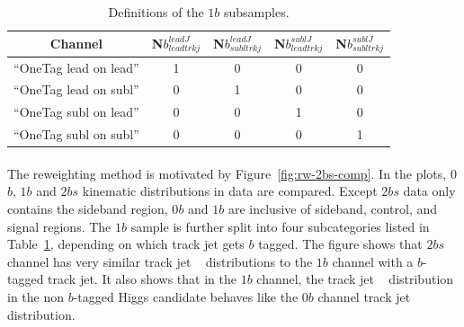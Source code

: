 \begin{table}[htb!]
\begin{center}
\caption{Definitions of the $1b$ subsamples.}
\begin{tabular}{c|c|c|c|c}
\hline
  Channel & N$b^{leadJ}_{leadtrkj}$ & N$b^{leadJ}_{subltrkj}$ & N$b^{sublJ}_{leadtrkj}$ & N$b^{sublJ}_{subltrkj}$ \\
  \hline
  ``OneTag lead on lead'' & 1 & 0 & 0 & 0 \\
  ``OneTag lead on subl'' & 0 & 1 & 0 & 0 \\
  ``OneTag subl on lead'' & 0 & 0 & 1 & 0 \\
  ``OneTag subl on subl'' & 0 & 0 & 0 & 1 \\
  \end{tabular}
\label{tab:boosted-qcd-1bsample}
\end{center}
\end{table}

\paragraph{}
The reweighting method is motivated by Figure~\ref{fig:rw-2bs-comp}.
In the plots, 0$b$, $1b$ and $2bs$ kinematic distributions in data are compared.
Except $2bs$ data only contains the sideband region, 0$b$ and $1b$ are inclusive of sideband, control, and signal regions.
The $1b$ sample is further split into four subcategories listed in Table~\ref{tab:boosted-qcd-1bsample}, depending on which track jet gets $b$ tagged.
The figure shows that $2bs$ channel has very similar track jet \pt~ distributions to the $1b$ channel with a $b$-tagged track jet.
It also shows that in the $1b$ channel, the track jet \pt~ distribution in the non $b$-tagged Higgs candidate behaves like the 0$b$ channel track jet \pt~ distribution.

